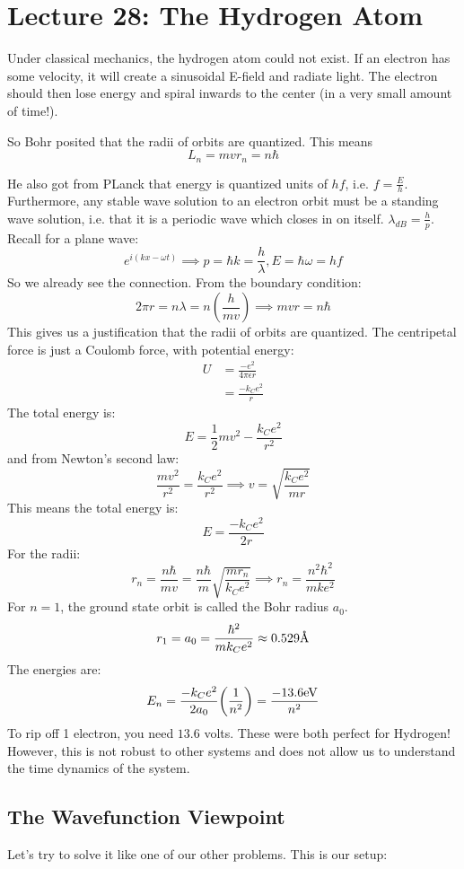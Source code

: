 \section{Lecture 28: The Hydrogen Atom}

Under classical mechanics, the hydrogen atom could not exist. If an electron has some velocity, it will
create a sinusoidal E-field and radiate light. The electron should then lose energy and spiral inwards to the center (in a very small amount of time!).

So Bohr posited that the radii of orbits are quantized. 
This means
\[ L_n = mvr_n = n\hbar \]

He also got from PLanck that energy is quantized units of $hf$, i.e. $f = \frac{E}{h}$.
Furthermore, any stable wave solution to an electron orbit must be a standing wave solution, i.e. that it is a periodic wave
which closes in on itself. $\lambda_{dB} = \frac{h}{p}$. Recall for a plane wave:
\[ e^{i(kx - \omega t)} \implies p = \hbar k = \frac{h}{\lambda}, E = \hbar \omega = hf \]
So we already see the connection. From the boundary condition:
\[ 2 \pi r = n \lambda = n(\frac{h}{mv}) \implies mvr = n\hbar \]
This gives us a justification that the radii of orbits are quantized. The centripetal force
is just a Coulomb force, with potential energy:
\begin{align*}
    U &= \frac{-e^2}{4\pi \epsilon r} \\
    &= \frac{-k_C e^2}{r}
\end{align*}
The total energy is:
\[ E = \frac{1}{2} mv^2 - \frac{k_Ce^2}{r^2} \]
and from Newton's second law:
\[ \frac{mv^2}{r^2} = \frac{k_Ce^2}{r^2} \implies v = \sqrt{\frac{k_Ce^2}{mr}} \]
This means the total energy is:
\[ E = \frac{-k_C e^2}{2r} \]
For the radii:
\[ r_n = \frac{n\hbar}{mv} = \frac{n\hbar}{m} \sqrt{\frac{mr_n}{k_Ce^2}} \implies r_n = \frac{n^2 \hbar^2}{mke^2}\]
For $n = 1$, the ground state orbit is called the Bohr radius $a_0$.
\[ r_1 = a_0 = \frac{\hbar^2}{m k_C e^2} \approx 0.529 \text{\r{A}} \]
The energies are:
\[ E_n = \frac{-k_C e^2}{2 a_0} \qty(\frac{1}{n^2}) = \frac{-13.6 \text{eV}}{n^2} \]
To rip off 1 electron, you need $13.6$ volts. These were both perfect for Hydrogen!
However, this is not robust to other systems and does not allow us to understand the time dynamics
of the system.

\subsection{The Wavefunction Viewpoint}
Let's try to solve it like one of our other problems. This is our setup:

